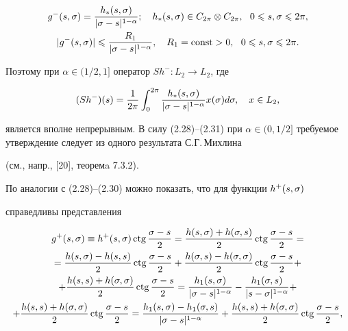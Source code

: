 \begin{gather}


g^-(s,\si)=\frac{h_*(s,\si)}{|\si-s|^{1-\alpha}};\quad


h_*(s,\si)\in C_{2\pi}\otimes C_{2\pi},\ \ 0\lea s,\si\lea 2\pi, \\


%


|g^-(s,\si)|\lea \frac{R_1}{|\si-s|^{1-\alpha}},\quad R_1=\const>0,\ \ 0\lea


s,\si\lea 2\pi.


\end{gather}


Поэтому при $\alpha\in (1/2,1]$ оператор $Sh^-:L_2\to L_2$, где


\begin{equation}


(Sh^-)(s) = \frac{1}{2\pi}\int_{0}^{2\pi}\frac{h_*(s,\si)}{|\si-s|^{1-


\alpha}}x(\si)d\si,\quad x\in L_2,


\end{equation}


является вполне непрерывным. В силу (2.28)--(2.31) при $\alpha\in


(0,1/2]$ требуемое утверждение следует из одного результата С.Г.\,Михлина


(см., напр., [20], теоремa 7.3.2).





По аналогии с (2.28)--(2.30) можно показать, что для функции $h^+(s,\sigma)$


справедливы представления


\begin{multline}


g^+(s,\si)\equiv h^+(s,\si)\ctg\frac{\si-


s}{2}=\frac{h(s,\si)+h(\si,s)}{2}\ctg\frac{\si-s}{2}= \\


=\frac{h(s,\si)-h(s,s)}{2}\ctg\frac{\si-s}{2}+


\frac{h(\si,s)-h(\si,\si)}{2}\ctg\frac{\si-s}{2}+\\


+\frac{h(s,s)+h(\si,\si)}{2}\ctg\frac{\si-s}{2}=\frac{h_1(s,\si)}{|\si-


s|^{1-\alpha}}-\frac{h_1(\si,s)}{|s-\si|^{1-\alpha}}+\\


+\frac{h(s,s)+h(\si,\si)}{2}\ctg\frac{\si-s}{2} =


\frac{h_1(s,\si)-h_1(\si,s)}{|\si-s|^{1-\alpha}}+


\frac{h(s,s)+h(\si,\si)}{2}\ctg\frac{\si-s}{2},


\end{multline}


